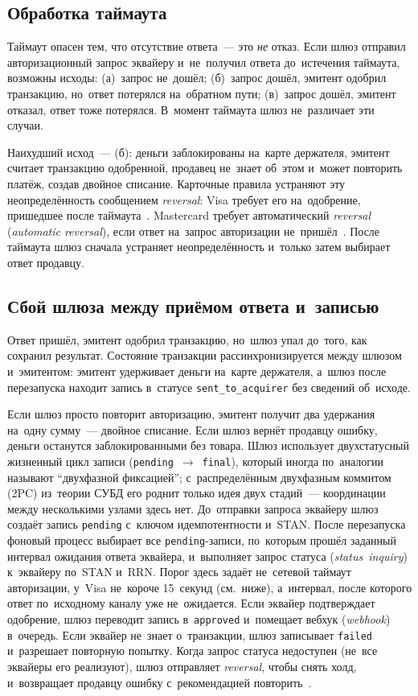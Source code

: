 \subsection*{Обработка таймаута}

Таймаут опасен тем, что отсутствие ответа~--- это \emph{не} отказ. Если шлюз
отправил авторизационный запрос эквайеру и~не~получил ответа до~истечения
таймаута, возможны исходы: (а)~запрос не~дошёл; (б)~запрос
дошёл, эмитент одобрил транзакцию, но~ответ потерялся на~обратном пути;
(в)~запрос дошёл, эмитент отказал, ответ тоже потерялся. В~момент таймаута
шлюз не~различает эти случаи.

Наихудший исход~--- (б): деньги заблокированы на~карте держателя, эмитент
считает транзакцию одобренной, продавец не~знает об~этом и~может повторить
платёж, создав двойное списание. Карточные правила устраняют эту неопределённость
сообщением \textit{reversal}: Visa требует его на~одобрение, пришедшее после
таймаута~\cite{visa-core-rules}. Mastercard требует автоматический \textit{reversal}
(\textit{automatic reversal}), если ответ на~запрос авторизации
не~пришёл~\cite{mc-tpr}. После таймаута шлюз сначала устраняет неопределённость
и~только затем выбирает ответ продавцу.

\subsection*{Сбой шлюза между приёмом ответа и~записью}

Ответ пришёл, эмитент одобрил транзакцию, но~шлюз упал до~того, как сохранил
результат. Состояние транзакции рассинхронизируется между шлюзом и~эмитентом:
эмитент удерживает деньги на~карте держателя, а~шлюз после перезапуска находит
запись в~статусе \texttt{sent\_to\_acquirer} без сведений об~исходе.

Если шлюз просто повторит авторизацию, эмитент получит два удержания на~одну
сумму~--- двойное списание. Если шлюз вернёт продавцу ошибку, деньги останутся
заблокированными без товара. Шлюз использует двухстатусный жизненный цикл записи
(\texttt{pending}~$\to$~\texttt{final}), который иногда по~аналогии называют
\enquote{двухфазной фиксацией}; с~распределённым двухфазным коммитом (2PC)
из~теории СУБД его роднит только идея двух стадий~--- координации между
несколькими узлами здесь нет. До~отправки запроса эквайеру шлюз создаёт запись
\texttt{pending} с~ключом идемпотентности и~STAN. После перезапуска фоновый процесс
выбирает все \texttt{pending}-записи, по~которым прошёл заданный интервал
ожидания ответа эквайера, и~выполняет запрос статуса (\textit{status~inquiry})
к~эквайеру по~STAN и~RRN. Порог здесь задаёт не~сетевой таймаут авторизации,
у~Visa не~короче 15~секунд (см.~ниже), а~интервал, после которого ответ
по~исходному каналу уже не~ожидается. Если эквайер подтверждает одобрение,
шлюз переводит запись в~\texttt{approved} и~помещает вебхук (\textit{webhook})
в~очередь. Если эквайер не~знает о~транзакции, шлюз записывает
\texttt{failed} и~разрешает повторную попытку. Когда запрос статуса недоступен
(не~все эквайеры его реализуют), шлюз отправляет \textit{reversal}, чтобы снять холд,
и~возвращает продавцу ошибку с~рекомендацией повторить~\cite{mc-tpr}.

